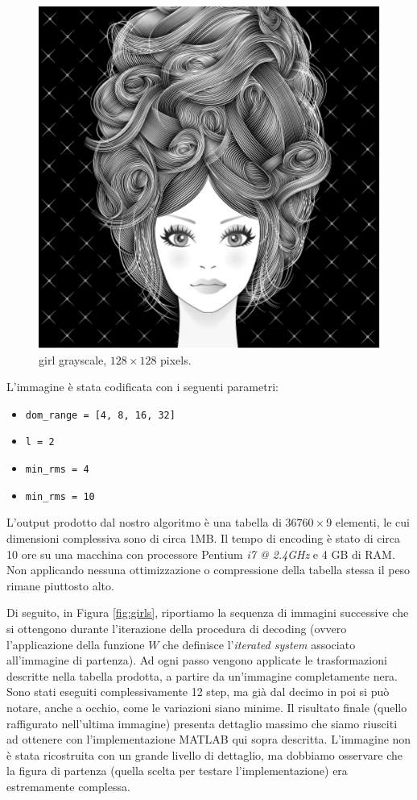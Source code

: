 \documentclass[11pt,a4paper,appendixprefix=true,numbers=noenddot]{scrreprt}
\begin{document}
\begin{figure}[ht]
\centering
\includegraphics[scale=0.4]{images/girl.pdf} 
\caption{girl grayscale, $128 \times 128$ pixels.}
\label{fig:girl}
\end{figure}

L'immagine è stata codificata con i seguenti parametri:

\begin{itemize}
\item \texttt{dom\_range = [4, 8, 16, 32]} 
\item \texttt{l = 2}
\item \texttt{min\_rms = 4}
\item \texttt{min\_rms = 10}
\end{itemize}

L'output prodotto dal nostro algoritmo è una tabella di $36760 \times 9$ elementi, le cui dimensioni complessiva sono di circa 1MB. Il tempo di encoding è stato di circa 10 ore su una macchina con processore Pentium  \emph{i7 @ 2.4GHz} e 4 GB di RAM. Non applicando nessuna ottimizzazione o compressione della tabella stessa il peso rimane piuttosto alto. 

Di seguito, in Figura \ref{fig:girls}, riportiamo la sequenza di immagini successive che si ottengono durante l'iterazione della procedura di decoding (ovvero l'applicazione della funzione $W$ che definisce l'\emph{iterated system} associato all'immagine di partenza). Ad ogni passo vengono applicate le trasformazioni descritte nella tabella prodotta, a partire da un'immagine completamente nera. Sono stati eseguiti complessivamente 12 step, ma già dal decimo in poi si può notare, anche a occhio, come le variazioni siano minime. Il risultato finale (quello raffigurato nell'ultima immagine) presenta dettaglio massimo che siamo riusciti ad ottenere con l'implementazione MATLAB qui sopra descritta. L'immagine non è stata ricostruita con un grande livello di dettaglio, ma dobbiamo osservare che la figura di partenza (quella scelta per testare l'implementazione) era estremamente complessa.
\end{document}
